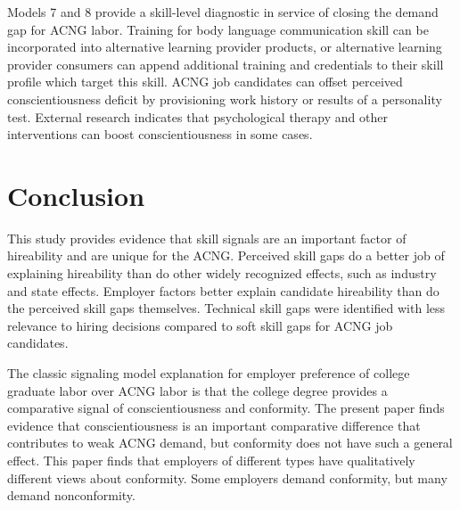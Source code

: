 \documentclass[review]{elsarticle}
\begin{document}
Models 7 and 8 provide a skill-level diagnostic in service of closing the demand gap for ACNG labor.
Training for body language communication skill can be incorporated into alternative learning provider products,
or alternative learning provider consumers can append additional training and credentials to their skill profile which target this skill.
%
ACNG job candidates can offset perceived conscientiousness deficit by provisioning work history or results of a personality test.
External research indicates that psychological therapy and other interventions can boost conscientiousness in some cases\cite{kilduff_tasselli_landis_2018}.

\section{Conclusion}


This study provides evidence that skill signals are an important factor of hireability and are unique for the ACNG.
Perceived skill gaps do a better job of explaining hireability than do other widely recognized effects, such as industry and state effects.
Employer factors better explain candidate hireability than do the perceived skill gaps themselves.
Technical skill gaps were identified with less relevance to hiring decisions compared to soft skill gaps for ACNG job candidates.

The classic signaling model explanation for employer preference of college graduate labor over ACNG labor is that
the college degree provides a comparative signal of conscientiousness and conformity.
The present paper finds evidence that conscientiousness is an important comparative difference that contributes to weak ACNG demand,
but conformity does not have such a general effect.
This paper finds that employers of different types have qualitatively different views about conformity.
Some employers demand conformity, but many demand nonconformity.
\end{document}
